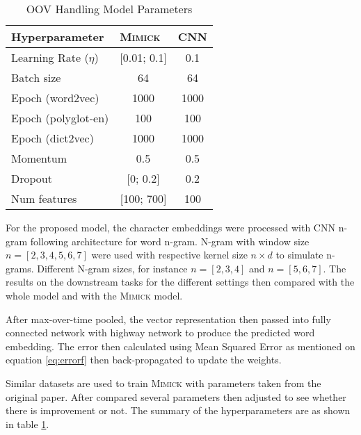         \begin{table}[]
            \centering
            \caption{OOV Handling Model Parameters}
            \label{tab:hyperparameter}
            \begin{tabular}{@{}lcc@{}}
                \toprule
                \textbf{Hyperparameter} & \multicolumn{1}{l}{\textbf{\textsc{Mimick}}} & \multicolumn{1}{l}{\textbf{CNN}} \\ \midrule
                Learning Rate ($\eta$) & [0.01; 0.1] & 0.1 \\
                Batch size & 64 & 64 \\
                Epoch (word2vec) & 1000 & 1000 \\
                Epoch (polyglot-en) & 100 & 100 \\
                Epoch (dict2vec) & 1000 & 1000 \\
                Momentum & 0.5 & 0.5 \\
                Dropout & [0; 0.2] & 0.2 \\
                Num features & [100; 700] & 100 \\ \bottomrule
            \end{tabular}
        \end{table}

        For the proposed model, the character embeddings were
        processed with CNN n-gram following
        \cite{convolutional2014kim} architecture for word n-gram.
        N-gram with window size $n = [2, 3, 4, 5, 6, 7]$ were used
        with respective kernel size $n \times d$ to simulate n-grams.
        Different N-gram sizes, for instance $n = [2, 3, 4]$ and $n =
        [5, 6, 7]$. The results on the downstream tasks for the
        different settings then compared with the whole model and with
        the \textsc{Mimick} model.
        
        After max-over-time pooled, the vector representation then
        passed into fully connected network with highway network to
        produce the predicted word embedding. The error then
        calculated using Mean Squared Error as mentioned on equation
        \ref{eq:errorf} then back-propagated to update the weights.

        Similar datasets are used to train \textsc{Mimick}
        \cite{mimicking2017Pinter} with parameters taken from the
        original paper. After compared several parameters then
        adjusted to see whether there is improvement or not. The
        summary of the hyperparameters are as shown in table
        \ref{tab:hyperparameter}.

